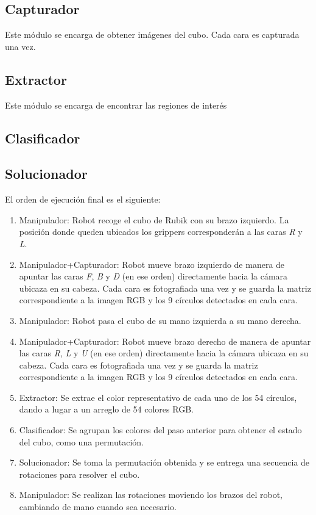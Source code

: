 \subsection{Capturador}
Este módulo se encarga de obtener imágenes del cubo. Cada cara es capturada una vez.
\subsection{Extractor}
Este módulo se encarga de encontrar las regiones de interés
\subsection{Clasificador}
\subsection{Solucionador}


El orden de ejecución final es el siguiente:
\begin{enumerate}
	\item Manipulador: Robot recoge el cubo de Rubik con su brazo izquierdo. La posición donde queden ubicados los grippers corresponderán a las caras \textit{R} y \textit{L}.
	\item Manipulador+Capturador: Robot mueve brazo izquierdo de manera de apuntar las caras \textit{F}, \textit{B} y \textit{D} (en ese orden) directamente hacia la cámara ubicaza en su cabeza. Cada cara es fotografiada una vez y se guarda la matriz correspondiente a la imagen RGB y los 9 círculos detectados en cada cara.
	\item Manipulador: Robot pasa el cubo de su mano izquierda a su mano derecha.
	\item Manipulador+Capturador: Robot mueve brazo derecho de manera de apuntar las caras \textit{R}, \textit{L} y \textit{U} (en ese orden) directamente hacia la cámara ubicaza en su cabeza. Cada cara es fotografiada una vez y se guarda la matriz correspondiente a la imagen RGB y los 9 círculos detectados en cada cara.
	\item Extractor: Se extrae el color representativo de cada uno de los 54 círculos, dando a lugar a un arreglo de 54 colores RGB.
	\item Clasificador: Se agrupan los colores del paso anterior para obtener el estado del cubo, como una permutación.
	\item Solucionador: Se toma la permutación obtenida y se entrega una secuencia de rotaciones para resolver el cubo.
	\item Manipulador: Se realizan las rotaciones moviendo los brazos del robot, cambiando de mano cuando sea necesario.
\end{enumerate}
